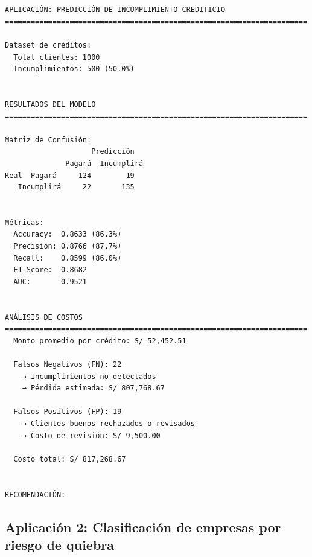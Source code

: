 \documentclass[
  doc,
  floatsintext,
  longtable,
  a4paper,
  nolmodern,
  notxfonts,
  notimes,
  12pt,
  colorlinks=true,linkcolor=blue,citecolor=blue,urlcolor=blue]{apa7}
\begin{document}
\begin{verbatim}


APLICACIÓN: PREDICCIÓN DE INCUMPLIMIENTO CREDITICIO
======================================================================

Dataset de créditos:
  Total clientes: 1000
  Incumplimientos: 500 (50.0%)


RESULTADOS DEL MODELO
======================================================================

Matriz de Confusión:
                    Predicción
              Pagará  Incumplirá
Real  Pagará     124        19
   Incumplirá     22       135


Métricas:
  Accuracy:  0.8633 (86.3%)
  Precision: 0.8766 (87.7%)
  Recall:    0.8599 (86.0%)
  F1-Score:  0.8682
  AUC:       0.9521


ANÁLISIS DE COSTOS
======================================================================
  Monto promedio por crédito: S/ 52,452.51

  Falsos Negativos (FN): 22
    → Incumplimientos no detectados
    → Pérdida estimada: S/ 807,768.67

  Falsos Positivos (FP): 19
    → Clientes buenos rechazados o revisados
    → Costo de revisión: S/ 9,500.00

  Costo total: S/ 817,268.67


RECOMENDACIÓN:
\end{verbatim}

\subsection{Aplicación 2: Clasificación de empresas por riesgo de
quiebra}\label{aplicaciuxf3n-2-clasificaciuxf3n-de-empresas-por-riesgo-de-quiebra}
\end{document}
